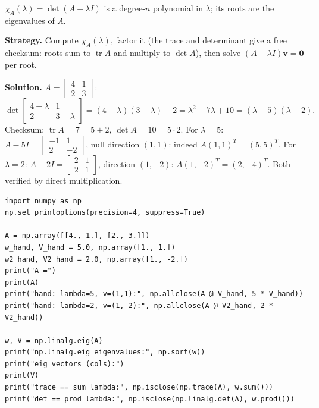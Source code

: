 \begin{definition}
$\chi_A(\lambda)=\det(A-\lambda I)$ is a degree-$n$ polynomial in
$\lambda$; its roots are the eigenvalues of $A$.
\end{definition}

\begin{example}\label{ex:eig2}
\textbf{Strategy.} Compute $\chi_A(\lambda)$, factor it (the trace and
determinant give a free checksum: roots sum to $\operatorname{tr}A$ and
multiply to $\det A$), then solve $(A-\lambda I)\mathbf v=\mathbf0$ per
root.

\textbf{Solution.} $A=\begin{bmatrix}4&1\\2&3\end{bmatrix}$:
\[
\det\begin{bmatrix}4-\lambda&1\\2&3-\lambda\end{bmatrix}
=(4-\lambda)(3-\lambda)-2=\lambda^2-7\lambda+10=(\lambda-5)(\lambda-2).
\]
Checksum: $\operatorname{tr}A=7=5+2$, $\det A=10=5\cdot2$. \checkmark
For $\lambda=5$: $A-5I=\begin{bmatrix}-1&1\\2&-2\end{bmatrix}$, null
direction $(1,1)$: indeed $A(1,1)^{T}=(5,5)^{T}$. For $\lambda=2$:
$A-2I=\begin{bmatrix}2&1\\2&1\end{bmatrix}$, direction $(1,-2)$:
$A(1,-2)^{T}=(2,-4)^{T}$. Both verified by direct multiplication.
\end{example}

\begin{lstlisting}[caption={\ttfamily code/ch07\_eig\_by\_hand.py --- the
hand answers checked by residual, plus \ttfamily np.linalg.eig and the two
checksums.}]
import numpy as np
np.set_printoptions(precision=4, suppress=True)

A = np.array([[4., 1.], [2., 3.]])
w_hand, V_hand = 5.0, np.array([1., 1.])
w2_hand, V2_hand = 2.0, np.array([1., -2.])
print("A =")
print(A)
print("hand: lambda=5, v=(1,1):", np.allclose(A @ V_hand, 5 * V_hand))
print("hand: lambda=2, v=(1,-2):", np.allclose(A @ V2_hand, 2 * V2_hand))

w, V = np.linalg.eig(A)
print("np.linalg.eig eigenvalues:", np.sort(w))
print("eig vectors (cols):")
print(V)
print("trace == sum lambda:", np.isclose(np.trace(A), w.sum()))
print("det == prod lambda:", np.isclose(np.linalg.det(A), w.prod()))
\end{lstlisting}

